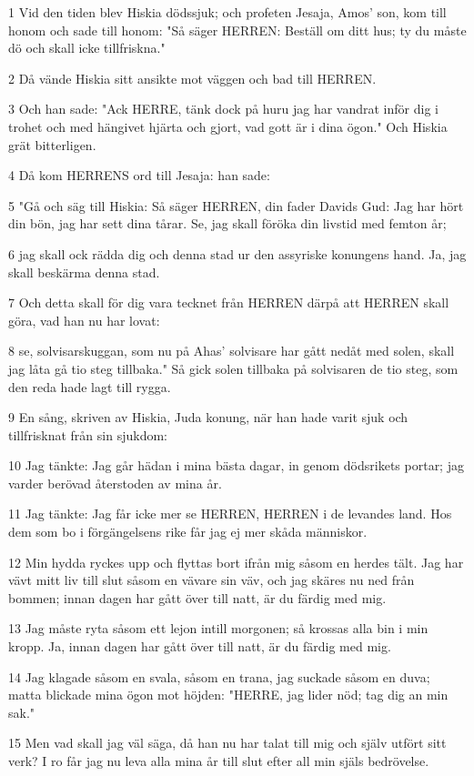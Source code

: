 \par 1 Vid den tiden blev Hiskia dödssjuk; och profeten Jesaja, Amos' son, kom till honom och sade till honom: "Så säger HERREN: Beställ om ditt hus; ty du måste dö och skall icke tillfriskna."
\par 2 Då vände Hiskia sitt ansikte mot väggen och bad till HERREN.
\par 3 Och han sade: "Ack HERRE, tänk dock på huru jag har vandrat inför dig i trohet och med hängivet hjärta och gjort, vad gott är i dina ögon." Och Hiskia grät bitterligen.
\par 4 Då kom HERRENS ord till Jesaja: han sade:
\par 5 "Gå och säg till Hiskia: Så säger HERREN, din fader Davids Gud: Jag har hört din bön, jag har sett dina tårar. Se, jag skall föröka din livstid med femton år;
\par 6 jag skall ock rädda dig och denna stad ur den assyriske konungens hand. Ja, jag skall beskärma denna stad.
\par 7 Och detta skall för dig vara tecknet från HERREN därpå att HERREN skall göra, vad han nu har lovat:
\par 8 se, solvisarskuggan, som nu på Ahas' solvisare har gått nedåt med solen, skall jag låta gå tio steg tillbaka." Så gick solen tillbaka på solvisaren de tio steg, som den reda hade lagt till rygga.
\par 9 En sång, skriven av Hiskia, Juda konung, när han hade varit sjuk och tillfrisknat från sin sjukdom:
\par 10 Jag tänkte: Jag går hädan i mina bästa dagar, in genom dödsrikets portar; jag varder berövad återstoden av mina år.
\par 11 Jag tänkte: Jag får icke mer se HERREN, HERREN i de levandes land. Hos dem som bo i förgängelsens rike får jag ej mer skåda människor.
\par 12 Min hydda ryckes upp och flyttas bort ifrån mig såsom en herdes tält. Jag har vävt mitt liv till slut såsom en vävare sin väv, och jag skäres nu ned från bommen; innan dagen har gått över till natt, är du färdig med mig.
\par 13 Jag måste ryta såsom ett lejon intill morgonen; så krossas alla bin i min kropp. Ja, innan dagen har gått över till natt, är du färdig med mig.
\par 14 Jag klagade såsom en svala, såsom en trana, jag suckade såsom en duva; matta blickade mina ögon mot höjden: "HERRE, jag lider nöd; tag dig an min sak."
\par 15 Men vad skall jag väl säga, då han nu har talat till mig och själv utfört sitt verk? I ro får jag nu leva alla mina år till slut efter all min själs bedrövelse.

